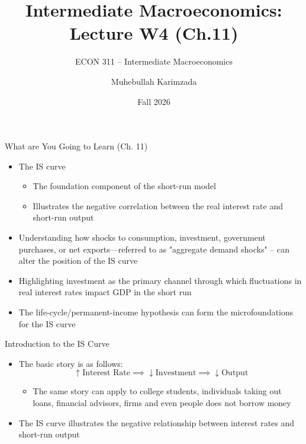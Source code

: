 \documentclass[aspectratio=1610]{beamer}
\title[Winter - Lecture 4] %
{Intermediate Macroeconomics: Lecture  W4 (Ch.11)}
\subtitle{ECON 311 -- Intermediate Macroeconomics}
\author{Muhebullah Karimzada}
\institute{School of Economics \\\ University of Northern British Columbia}
\date{Fall 2026}
\begin{document}
\begin{frame}[plain]
  \titlepage
\end{frame}

\begin{frame}[wide]{What are You Going to Learn (Ch. 11)}
	\begin{itemize}
		\item The IS curve
		\begin{itemize}
			\item The foundation component of the short-run model
			\item Illustrates the negative correlation between the real interest rate and short-run output
		\end{itemize}
		\item Understanding how shocks to consumption, investment, government purchases, or net exports—referred to as "aggregate demand shocks" -- can alter the position of the IS curve
		\item Highlighting investment as the primary channel through which fluctuations in real interest rates impact GDP in the short run
		\item The life-cycle/permanent-income hypothesis can form the microfoundations for the IS curve
	
		
	\end{itemize}
\end{frame}

\begin{frame}[wide]{Introduction to the IS Curve}
	\begin{itemize}
		\item The basic story is as follows: 
		\[\uparrow \text{Interest Rate} \implies \downarrow \text{Investment} \implies \downarrow \text{Output}\]
		\begin{itemize}
			\item The same story can apply to college students, individuals taking out loans, financial advisors, firms and even people does not borrow money
		\end{itemize}
		\vspace{8mm}
		\item The IS curve illustrates the negative relationship between interest rates and short-run output		
	\end{itemize}
\end{frame}
\end{document}
